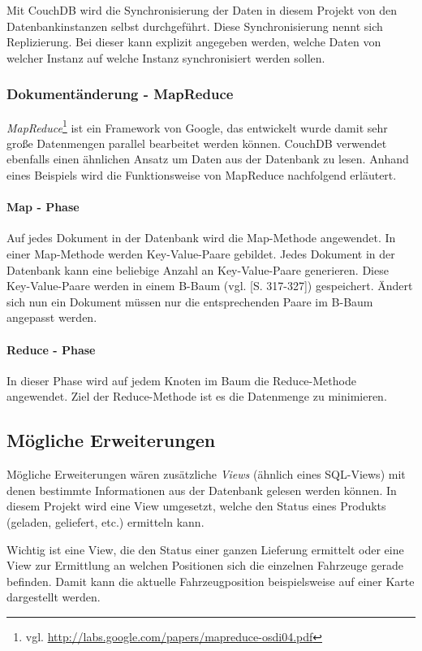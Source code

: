 Mit CouchDB wird die Synchronisierung der Daten in diesem Projekt von den
	Datenbankinstanzen selbst durchgeführt. Diese Synchronisierung nennt sich 
	Replizierung. Bei dieser kann explizit angegeben werden, welche Daten
	von welcher Instanz auf welche Instanz synchronisiert werden sollen.

\subsubsection{Dokumentänderung - MapReduce}

\emph{MapReduce}\footnote{vgl. \url{http://labs.google.com/papers/mapreduce-osdi04.pdf}}
	ist ein Framework von Google, das entwickelt wurde damit sehr große
	Datenmengen parallel bearbeitet werden können. CouchDB verwendet ebenfalls
	einen ähnlichen Ansatz um Daten aus der Datenbank zu lesen. Anhand eines
	Beispiels wird die Funktionsweise von MapReduce nachfolgend erläutert.

\paragraph{Map - Phase} Auf jedes Dokument in der Datenbank wird die Map-Methode
	angewendet. In einer Map-Methode werden Key-Value-Paare gebildet. Jedes
	Dokument in der Datenbank kann eine beliebige Anzahl an Key-Value-Paare
	generieren. Diese Key-Value-Paare werden in einem B-Baum (vgl.
	\cite{Ottmann96}[S. 317-327]) gespeichert. Ändert sich nun ein Dokument müssen
	nur die entsprechenden Paare im B-Baum angepasst werden. 

\paragraph{Reduce - Phase} In dieser Phase wird auf jedem Knoten im Baum die
	Reduce-Methode angewendet. Ziel der Reduce-Methode ist es die Datenmenge zu
	minimieren.

\subsection{Mögliche Erweiterungen}

Mögliche Erweiterungen wären zusätzliche \emph{Views} (ähnlich eines SQL-Views)
	mit denen bestimmte Informationen aus der Datenbank gelesen werden können.
	In diesem Projekt wird eine View umgesetzt, welche den Status eines Produkts
	(geladen, geliefert, etc.) ermitteln kann.

Wichtig ist eine View, die den Status einer ganzen Lieferung ermittelt oder
	eine View zur Ermittlung an welchen Positionen sich die einzelnen Fahrzeuge
	gerade befinden. Damit kann die aktuelle Fahrzeugposition beispielsweise auf
	einer Karte	dargestellt werden.

